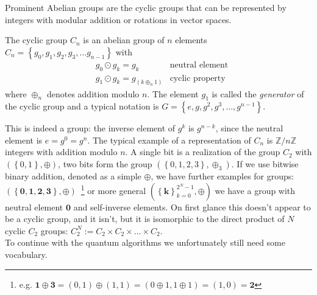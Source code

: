 Prominent Abelian groups are the cyclic groups that can be represented by integers with modular addition or rotations in vector spaces.
\begin{def*}
The cyclic group $C_n$ is an abelian group of $n$ elements $C_n = \left\{g_0,g_1,g_2,g_3,\dots g_{n-1}\right\}$ with
\begin{align}
    &g_0\odot g_k = g_k & \text{neutral element}\\
    &g_1 \odot g_k = g_{(k\oplus_n1) } & \text{cyclic property}
\end{align}
where $\oplus_n$ denotes addition modulo $n$.
The element $g_1$ is called the \textit{generator} of the cyclic group and a typical notation is $G=\left\{e,g,g^2,g^3,\dots, g^{n-1}\right\}$.
\end{def*}
This is indeed a group: the inverse element of $g^k$ is $g^{n-k}$, since the neutral element is $e=g^0=g^n$. The typical example of a representation of $C_n$ is $\mathbb{Z}/n\mathbb{Z}$ integers with addition modulo $n$. 
A single bit is a realization of the group $C_2$ with $(\left\{0,1\right\},\oplus)$, two bits form the group $\left(\left\{0,1,2,3\right\}, \oplus_3\right)$. 
If we use bitwise binary addition, denoted as a simple $\oplus$, we have further examples for groups: $(\left\{\mathbf{0},\mathbf{1},\mathbf{2},\mathbf{3}\right\}, \oplus)$~\footnote{e.g. $\mathbf{1}\oplus\mathbf{3} = (0,1)\oplus(1,1) = (0\oplus 1, 1\oplus 1) = (1,0) = \mathbf{2}$} or more general $(\left\{\mathbf{k}\right\}_{k=0}^{2^N-1}, \oplus)$ we have a group with neutral element $\mathbf{0}$ and self-inverse elements. On first glance this doesn't appear to be a cyclic group, and it isn't, but it is isomorphic to the direct product of $N$ cyclic $C_2$ groups: $C^N_2:=C_2\times C_2\times \dots \times C_2$.\\
To continue with the quantum algorithms we unfortunately still need some vocabulary.

